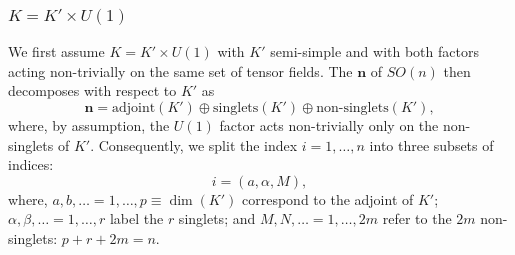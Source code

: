 \documentclass[a4paper,11pt]{article}
\begin{document}
\subsubsection{$K=K'\times U(1)$}

We first assume $K=K'\times U(1)$ with $K'$ semi-simple and
with both factors acting non-trivially on the same set of tensor
fields. The $\textbf{n}$ of $SO(n)$ then decomposes with respect
to $K'$ as
\begin{displaymath}
\mathbf{n}=\textrm{adjoint}(K')\oplus \textrm{singlets}(K')\oplus
\textrm{non-singlets}(K'),
\end{displaymath}
where, by assumption, the $U(1)$ factor acts non-trivially only on
the non-singlets of $K'$. Consequently, we split the index
$i=1,\ldots, n$ into three subsets of indices:
\begin{equation}
i=(a,\alpha,M),
\end{equation}
where, $a,b,\ldots=1,\ldots, p\equiv \dim{(K')}$ correspond to the
adjoint of $K'$; $\alpha,\beta,\ldots=1,\ldots,r$ label the $r$
singlets; and $M,N,\ldots=1,\ldots, 2m$ refer to the $2m$
non-singlets: $p+r+2m=n$.
\end{document}
